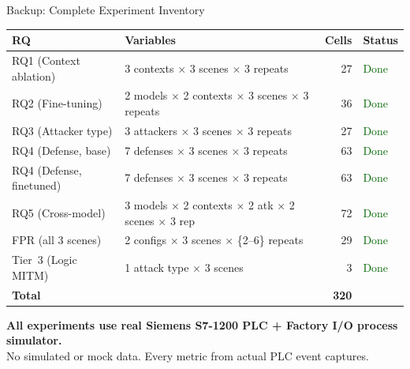 \documentclass[aspectratio=169,10pt]{beamer}
\begin{document}
\begin{frame}{Backup: Complete Experiment Inventory}

\begin{table}
\centering
\small
\begin{tabular}{@{}llrl@{}}
\toprule
\textbf{RQ} & \textbf{Variables} & \textbf{Cells} & \textbf{Status} \\
\midrule
RQ1 (Context ablation) & 3 contexts $\times$ 3 scenes $\times$ 3 repeats & 27 & \textcolor{darkgreen}{Done} \\
RQ2 (Fine-tuning) & 2 models $\times$ 2 contexts $\times$ 3 scenes $\times$ 3 repeats & 36 & \textcolor{darkgreen}{Done} \\
RQ3 (Attacker type) & 3 attackers $\times$ 3 scenes $\times$ 3 repeats & 27 & \textcolor{darkgreen}{Done} \\
RQ4 (Defense, base) & 7 defenses $\times$ 3 scenes $\times$ 3 repeats & 63 & \textcolor{darkgreen}{Done} \\
RQ4 (Defense, finetuned) & 7 defenses $\times$ 3 scenes $\times$ 3 repeats & 63 & \textcolor{darkgreen}{Done} \\
RQ5 (Cross-model) & 3 models $\times$ 2 contexts $\times$ 2 atk $\times$ 2 scenes $\times$ 3 rep & 72 & \textcolor{darkgreen}{Done} \\
\midrule
FPR (all 3 scenes) & 2 configs $\times$ 3 scenes $\times$ \{2--6\} repeats & 29 & \textcolor{darkgreen}{Done} \\
Tier~3 (Logic MITM) & 1 attack type $\times$ 3 scenes & 3 & \textcolor{darkgreen}{Done} \\
\midrule
\textbf{Total} & & \textbf{320} & \\
\bottomrule
\end{tabular}
\end{table}

\vspace{0.3em}
\textbf{All experiments use real Siemens S7-1200 PLC + Factory I/O process simulator.}\\
No simulated or mock data. Every metric from actual PLC event captures.
\end{frame}
\end{document}
